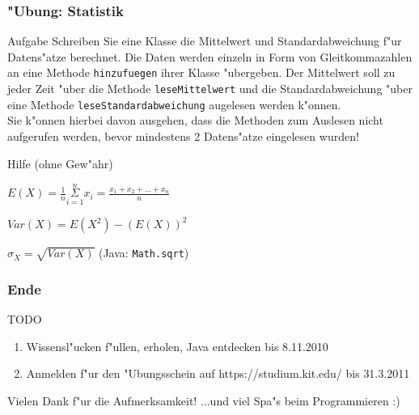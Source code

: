 \documentclass{beamer}
\begin{document}
\begin{frame}
\frametitle{"Ubung: Statistik}
\begin{block}{Aufgabe}
Schreiben Sie eine Klasse die Mittelwert und Standardabweichung f"ur Datens"atze berechnet. Die Daten werden einzeln in Form von Gleitkommazahlen an eine Methode \texttt{hinzufuegen} ihrer Klasse "ubergeben. Der Mittelwert soll zu jeder Zeit "uber die Methode \texttt{leseMittelwert} und die Standardabweichung "uber eine Methode \texttt{leseStandardabweichung} augelesen werden k"onnen.\\Sie k"onnen hierbei davon ausgehen, dass die Methoden zum Auslesen nicht aufgerufen werden, bevor mindestens 2 Datens"atze eingelesen wurden!
\end{block}

\begin{block}{Hilfe (ohne Gew"ahr)}
\begin{description}[Standardabweichung]
\item[Mittelwert] $E(X) = \frac{1}{n} \underset{i = 1}{\overset{n}{\Sigma}} x_i = \frac{x_1 + x_2 + ... + x_n}{n}$
\item[Varianz] $Var(X) = E(X^2) - (E(X))^2$
\item[Standardabweichung] $\sigma_X = \sqrt{Var(X)}$ \hspace{5em} (Java: \texttt{Math.sqrt})
\end{description}
\end{block}
\end{frame}


\begin{frame}
\frametitle{Ende}
\begin{block}{TODO}
\begin{enumerate}
\item Wissensl"ucken f"ullen, erholen, Java entdecken bis \alert{8.11.2010}
\item Anmelden f"ur den "Ubungsschein auf https://studium.kit.edu/ bis \alert{31.3.2011}
\end{enumerate}
\end{block}

\begin{block}{Vielen Dank f"ur die Aufmerksamkeit!}
...und viel Spa"s beim Programmieren :)
\end{block}
\end{frame}
\end{document}
